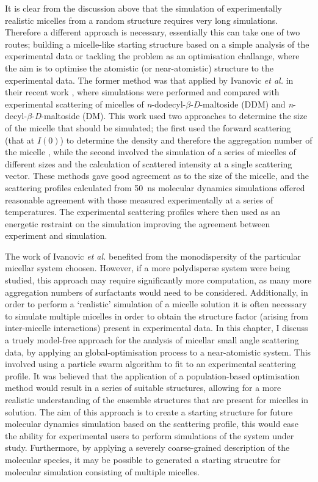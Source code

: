It is clear from the discussion above that the simulation of experimentally realistic micelles from a random structure requires very long simulations.
Therefore a different approach is necessary, essentially this can take one of two routes; building a micelle-like starting structure based on a simple analysis of the experimental data or tackling the problem as an optimisation challange, where the aim is to optimise the atomistic (or near-atomistic) structure to the experimental data.
The former method was that applied by Ivanovic \emph{et al.} in their recent work \cite{ivanovic_temperature-dependent_2018}, where simulations were performed and compared with experimental scattering of micelles of \emph{n}-dodecyl-$\beta$-\emph{D}-maltoside (DDM) and \emph{n}-decyl-$\beta$-\emph{D}-maltoside (DM).
This work used two approaches to determine the size of the micelle that should be simulated; the first used the forward scattering (that at $I(0)$) to determine the density and therefore the aggregation number of the micelle \cite{lipfert_size_2007}, while the second involved the simulation of a series of micelles of different sizes and the calculation of scattered intensity at a single scattering vector.
These methods gave good agreement as to the size of the micelle, and the scattering profiles calculated from \SI{50}{\nano\second} molecular dynamics simulations offered reasonable agreement with those measured experimentally at a series of temperatures.
The experimental scattering profiles where then used as an energetic restraint on the simulation improving the agreement between experiment and simulation.

The work of Ivanovic \emph{et al.} benefited from the monodispersity of the particular micellar system choosen.
However, if a more polydisperse system were being studied, this approach may require significantly more computation, as many more aggregation numbers of surfactants would need to be considered.
Additionally, in order to perform a `realistic' simulation of a micelle solution it is often necessary to simulate multiple micelles in order to obtain the structure factor (arising from inter-micelle interactions) present in experimental data.
In this chapter, I discuss a truely model-free approach for the analysis of micellar small angle scattering data, by applying an global-optimisation process to a near-atomistic system.
This involved using a particle swarm algorithm to fit to an experimental scattering profile.
It was believed that the application of a population-based optimisation method would result in a series of suitable structures, allowing for a more realistic understanding of the ensemble structures that are present for micelles in solution.
The aim of this approach is to create a starting structure for future molecular dynamics simulation based on the scattering profile, this would ease the ability for experimental users to perform simulations of the system under study.
Furthermore, by applying a severely coarse-grained description of the molecular species, it may be possible to generated a starting strucutre for molecular simulation consisting of multiple micelles.
